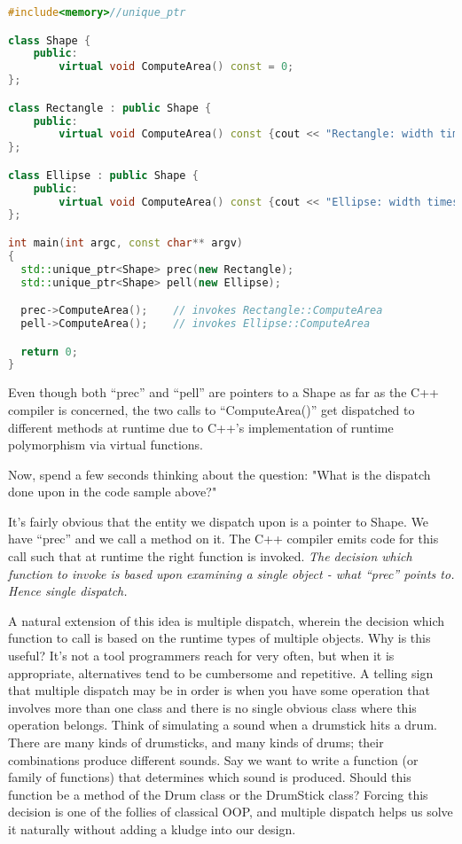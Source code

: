 \documentclass{book}
\begin{document}
\begin{lstlisting}[caption={C++ runtime polymorphism}, language=C++]
#include<memory>//unique_ptr

class Shape {
    public:
        virtual void ComputeArea() const = 0;
};

class Rectangle : public Shape {
    public:
        virtual void ComputeArea() const {cout << "Rectangle: width times height\n"; }
};

class Ellipse : public Shape {
    public:
        virtual void ComputeArea() const {cout << "Ellipse: width times height times pi/4\n"; }
};

int main(int argc, const char** argv) 
{
  std::unique_ptr<Shape> prec(new Rectangle);
  std::unique_ptr<Shape> pell(new Ellipse);

  prec->ComputeArea();    // invokes Rectangle::ComputeArea
  pell->ComputeArea();    // invokes Ellipse::ComputeArea

  return 0;
}
\end{lstlisting}

Even though both ``prec'' and ``pell'' are pointers to a Shape as far as the C++ compiler is concerned,
the two calls to ``ComputeArea()'' get dispatched to different methods at runtime due to C++'s implementation of runtime polymorphism via virtual functions.

Now, spend a few seconds thinking about the question: "What is the dispatch done upon in the code sample above?"

It's fairly obvious that the entity we dispatch upon is a pointer to Shape. We have ``prec'' and we call a method on it.
The C++ compiler emits code for this call such that at runtime the right function is invoked.
\textit{The decision which function to invoke is based upon examining a single object - what ``prec'' points to. Hence single dispatch.}

A natural extension of this idea is multiple dispatch, wherein the decision which function to call is based on the runtime types of multiple objects.
Why is this useful? It's not a tool programmers reach for very often, but when it is appropriate, alternatives tend to be cumbersome and repetitive.
A telling sign that multiple dispatch may be in order is when you have some operation that involves more than one class and there is no single obvious class where this operation belongs.
Think of simulating a sound when a drumstick hits a drum. There are many kinds of drumsticks, and many kinds of drums; their combinations produce different sounds.
Say we want to write a function (or family of functions) that determines which sound is produced.
Should this function be a method of the Drum class or the DrumStick class? Forcing this decision is one of the follies of classical OOP,
and multiple dispatch helps us solve it naturally without adding a kludge into our design.
\end{document}

